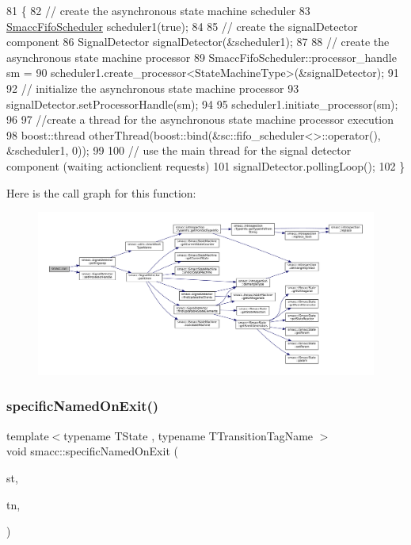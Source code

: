\begin{DoxyCode}
81 \{
82     \textcolor{comment}{// create the asynchronous state machine scheduler}
83     \hyperlink{smacc__fifo__scheduler_8h_a0063e275231c80d5f97df21d17257bf7}{SmaccFifoScheduler} scheduler1(\textcolor{keyword}{true});
84 
85     \textcolor{comment}{// create the signalDetector component}
86     SignalDetector signalDetector(&scheduler1);
87 
88     \textcolor{comment}{// create the asynchronous state machine processor}
89     SmaccFifoScheduler::processor\_handle sm =
90         scheduler1.create\_processor<StateMachineType>(&signalDetector);
91 
92     \textcolor{comment}{// initialize the asynchronous state machine processor}
93     signalDetector.setProcessorHandle(sm);
94 
95     scheduler1.initiate\_processor(sm);
96 
97     \textcolor{comment}{//create a thread for the asynchronous state machine processor execution}
98     boost::thread otherThread(boost::bind(&sc::fifo\_scheduler<>::operator(), &scheduler1, 0));
99 
100     \textcolor{comment}{// use the  main thread for the signal detector component (waiting actionclient requests)}
101     signalDetector.pollingLoop();
102 \}
\end{DoxyCode}
Here is the call graph for this function\+:
\nopagebreak
\begin{figure}[H]
\begin{center}
\leavevmode
\includegraphics[width=350pt]{namespacesmacc_a47ac3b8d2968b1ba4152afd64ab66bd0_cgraph}
\end{center}
\end{figure}
\mbox{\label{namespacesmacc_afd94fcb8f8c410a0ced7954bf76e845d}} 
\subsubsection{\texorpdfstring{specific\+Named\+On\+Exit()}{specificNamedOnExit()}\hspace{0.1cm}{\footnotesize\ttfamily [1/3]}}
{\footnotesize\ttfamily template$<$typename T\+State , typename T\+Transition\+Tag\+Name $>$ \\
void smacc\+::specific\+Named\+On\+Exit (\begin{DoxyParamCaption}\item[{T\+State \&}]{st,  }\item[{T\+Transition\+Tag\+Name}]{tn,  }\item[{std\+::true\+\_\+type}]{ }\end{DoxyParamCaption})}



